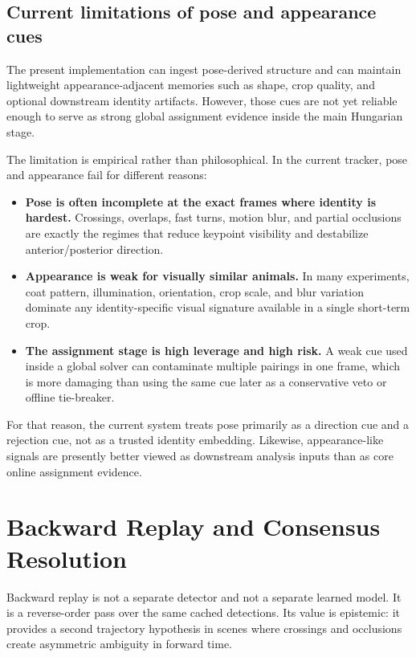 \documentclass[11pt]{article}
\begin{document}
\subsection{Current limitations of pose and appearance cues}

The present implementation can ingest pose-derived structure and can maintain lightweight appearance-adjacent memories such as shape, crop quality, and optional downstream identity artifacts. However, those cues are not yet reliable enough to serve as strong global assignment evidence inside the main Hungarian stage.

The limitation is empirical rather than philosophical. In the current tracker, pose and appearance fail for different reasons:

\begin{itemize}
  \item \textbf{Pose is often incomplete at the exact frames where identity is hardest.} Crossings, overlaps, fast turns, motion blur, and partial occlusions are exactly the regimes that reduce keypoint visibility and destabilize anterior/posterior direction.
  \item \textbf{Appearance is weak for visually similar animals.} In many experiments, coat pattern, illumination, orientation, crop scale, and blur variation dominate any identity-specific visual signature available in a single short-term crop.
  \item \textbf{The assignment stage is high leverage and high risk.} A weak cue used inside a global solver can contaminate multiple pairings in one frame, which is more damaging than using the same cue later as a conservative veto or offline tie-breaker.
\end{itemize}

For that reason, the current system treats pose primarily as a direction cue and a rejection cue, not as a trusted identity embedding. Likewise, appearance-like signals are presently better viewed as downstream analysis inputs than as core online assignment evidence.

\section{Backward Replay and Consensus Resolution}

Backward replay is not a separate detector and not a separate learned model. It is a reverse-order pass over the same cached detections. Its value is epistemic: it provides a second trajectory hypothesis in scenes where crossings and occlusions create asymmetric ambiguity in forward time.
\end{document}
